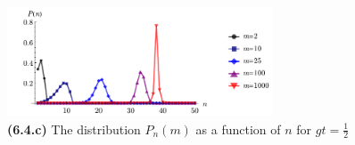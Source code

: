\begin{figure}[h]
    \centering
    \includegraphics[width=0.7\textwidth]{imgs/QH6.pdf}
    \caption{\textbf{(6.4.c)} The distribution $P_n(m)$ as a function of $n$ for $gt = \tfrac{1}{2}$}
    \label{fig:3}
\end{figure}